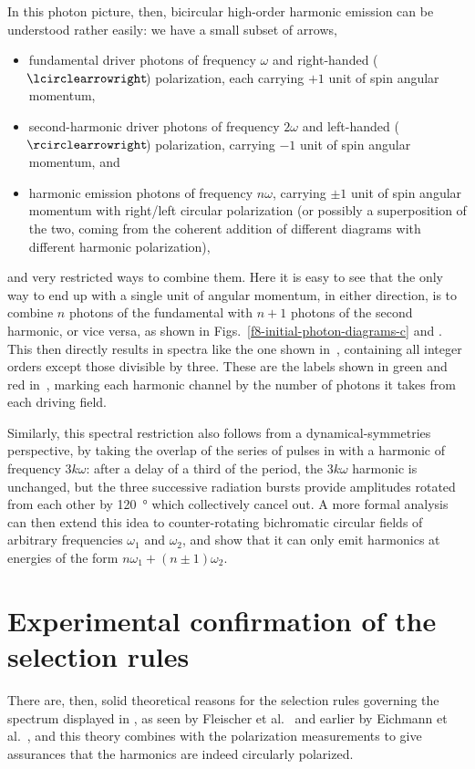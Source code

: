 In this photon picture, then, bicircular high-order harmonic emission can be understood rather easily: we have a small subset of arrows, 
\begin{itemize}
  \item fundamental driver photons of frequency $\omega$ and right-handed (${\rightpol}\!$) polarization, each carrying $+1$ unit of spin angular momentum, 
  \item second-harmonic driver photons of frequency $2\omega$ and left-handed (${\leftpol}\!$) polarization, carrying $-1$ unit of spin angular momentum, and 
  \item harmonic emission photons of frequency $n\omega$, carrying $\pm1$ unit of spin angular momentum with right/left circular polarization (or possibly a superposition of the two, coming from the coherent addition of different diagrams with different harmonic polarization),
\end{itemize}
and very restricted ways to combine them. Here it is easy to see that the only way to end up with a single unit of angular momentum, in either direction, is to combine $n$ photons of the fundamental with $n+1$ photons of the second harmonic, or vice versa, as shown in Figs.~\ref{f8-initial-photon-diagrams-c} and \protect{}. This then directly results in spectra like the one shown in~, containing all integer orders except those divisible by three. These are the labels shown in green and red in~, marking each harmonic channel by the number of photons it takes from each driving field.


Similarly, this spectral restriction also follows from a dynamical-symmetries perspective, by taking the overlap of the series of pulses in  with a harmonic of frequency $3k\omega$: after a delay of a third of the period, the $3k\omega$ harmonic is unchanged, but the three successive radiation bursts provide amplitudes rotated from each other by \SI{120}{\degree} which collectively cancel out. A more formal analysis~\cite{SelectionRulesInHHG, averbukh_stability_2002} can then extend this idea to counter-rotating bichromatic circular fields of arbitrary frequencies $\omega_1$ and $\omega_2$, and show that it can only emit harmonics at energies of the form $n\omega_1+(n\pm 1)\omega_2$.





\section{Experimental confirmation of the selection rules}
There are, then, solid theoretical reasons for the selection rules governing the spectrum displayed in , as seen by Fleischer et al.~\cite{fleischer_spin_2014} and earlier by Eichmann et al.~\cite{EichmannExperiment}, and this theory combines with the polarization measurements to give assurances that the harmonics are indeed circularly polarized.

